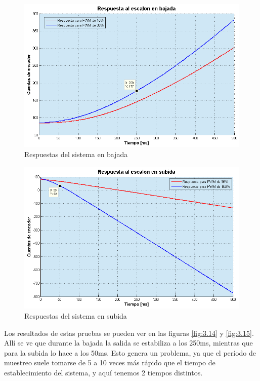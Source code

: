 \begin{figure}[!ht]
	\centering
	\includegraphics[width=15cm,scale=1]{resources/3_14-respuestaEnBajada.png}
	\caption{Respuestas del sistema en bajada}
	\label{fig:\thefigure}
\end{figure}

\begin{figure}[!ht]
	\centering
	\includegraphics[width=15cm,scale=1]{resources/3_15-respuestaEnSubida.png}
	\caption{Respuestas del sistema en subida}
	\label{fig:\thefigure}
\end{figure}

Los resultados de estas pruebas se pueden ver en las figuras \ref{fig:3.14} y \ref{fig:3.15}. Allí se ve que durante la bajada la salida se estabiliza a los 250ms, mientras que para la subida lo hace a los 50ms. Esto genera un problema, ya que el período de muestreo suele tomarse de 5 a 10 veces más rápido que el tiempo de establecimiento del sistema, y aquí tenemos 2 tiempos distintos. \\

